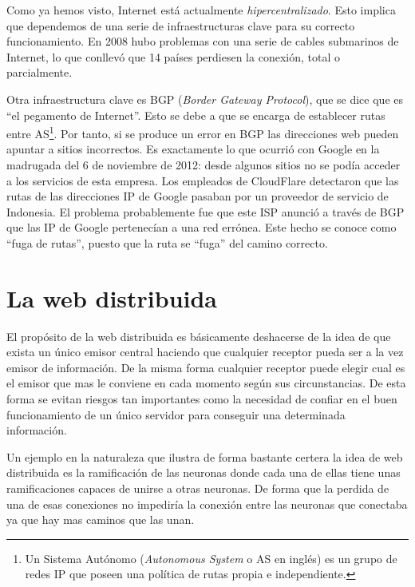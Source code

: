 \documentclass[12pt]{article} %
\begin{document}
Como ya hemos visto, Internet está actualmente \textit{hipercentralizado}. Esto implica que dependemos de una serie de infraestructuras clave para su correcto funcionamiento. En 2008 hubo problemas con una serie de cables submarinos de Internet, lo que conllevó que 14 países perdiesen la conexión, total o parcialmente\cite{2008-cable-disruption}.

Otra infraestructura clave es BGP (\textit{Border Gateway Protocol}), que se dice que es ``el pegamento de Internet''. Esto se debe a que se encarga de establecer rutas entre AS\footnote{Un Sistema Autónomo (\textit{Autonomous System} o AS en inglés) es un grupo de redes IP que poseen una política de rutas propia e independiente.}. Por tanto, si se produce un error en BGP las direcciones web pueden apuntar a sitios incorrectos. Es exactamente lo que ocurrió con Google en la madrugada del 6 de noviembre de 2012: desde algunos sitios no se podía acceder a los servicios de esta empresa. Los empleados de CloudFlare\cite{cloudflare-google-outage} detectaron que las rutas de las direcciones IP de Google pasaban por un proveedor de servicio de Indonesia. El problema probablemente fue que este ISP anunció a través de BGP que las IP de Google pertenecían a una red errónea. Este hecho se conoce como ``fuga de rutas'', puesto que la ruta se ``fuga'' del camino correcto.



\section{La web distribuida} %
\label{sec:la_web_distribuida}

El propósito de la web distribuida es básicamente deshacerse de la idea de que exista un único emisor central haciendo que cualquier receptor pueda ser a la vez emisor de información. De la misma forma cualquier receptor puede elegir cual es el emisor que mas le conviene en cada momento según sus circunstancias. De esta forma se evitan riesgos tan importantes como la necesidad de confiar en el buen funcionamiento de un único servidor para conseguir una determinada información.

Un ejemplo en la naturaleza que ilustra de forma bastante certera la idea de web distribuida es la ramificación de las neuronas donde cada una de ellas tiene unas ramificaciones capaces de unirse a otras neuronas. De forma que la perdida de una de esas conexiones no impediría la conexión entre las neuronas que conectaba ya que hay mas caminos que las unan.
\end{document}
